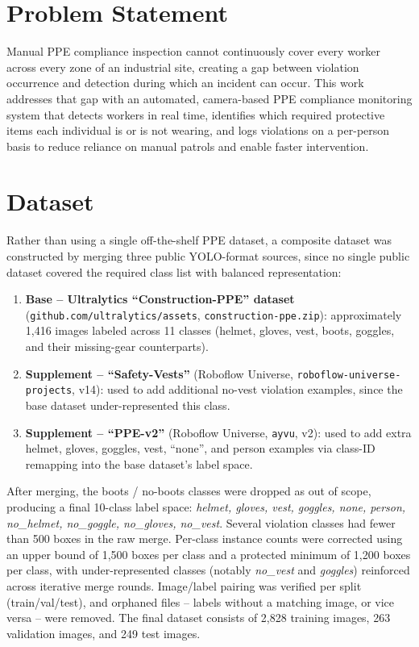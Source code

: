 \documentclass[conference]{IEEEtran}
\begin{document}
\section{Problem Statement}

Manual PPE compliance inspection cannot continuously cover every worker across every zone of an industrial site, creating a gap between violation occurrence and detection during which an incident can occur. This work addresses that gap with an automated, camera-based PPE compliance monitoring system that detects workers in real time, identifies which required protective items each individual is or is not wearing, and logs violations on a per-person basis to reduce reliance on manual patrols and enable faster intervention.

\section{Dataset}

Rather than using a single off-the-shelf PPE dataset, a composite dataset was constructed by merging three public YOLO-format sources, since no single public dataset covered the required class list with balanced representation:

\begin{enumerate}
    \item \textbf{Base -- Ultralytics ``Construction-PPE'' dataset} (\texttt{github.com/ultralytics/assets}, \texttt{construction-ppe.zip}): approximately 1,416 images labeled across 11 classes (helmet, gloves, vest, boots, goggles, and their missing-gear counterparts).
    \item \textbf{Supplement -- ``Safety-Vests''} (Roboflow Universe, \texttt{roboflow-universe-projects}, v14): used to add additional no-vest violation examples, since the base dataset under-represented this class.
    \item \textbf{Supplement -- ``PPE-v2''} (Roboflow Universe, \texttt{ayvu}, v2): used to add extra helmet, gloves, goggles, vest, ``none'', and person examples via class-ID remapping into the base dataset's label space.
\end{enumerate}

After merging, the boots / no-boots classes were dropped as out of scope, producing a final 10-class label space: \textit{helmet, gloves, vest, goggles, none, person, no\_helmet, no\_goggle, no\_gloves, no\_vest}. Several violation classes had fewer than 500 boxes in the raw merge. Per-class instance counts were corrected using an upper bound of 1,500 boxes per class and a protected minimum of 1,200 boxes per class, with under-represented classes (notably \textit{no\_vest} and \textit{goggles}) reinforced across iterative merge rounds. Image/label pairing was verified per split (train/val/test), and orphaned files -- labels without a matching image, or vice versa -- were removed. The final dataset consists of 2,828 training images, 263 validation images, and 249 test images.
\end{document}
